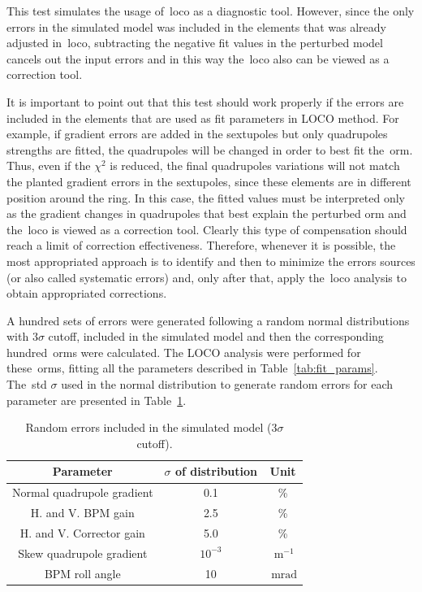 This test simulates the usage of~\gls{loco} as a diagnostic tool. However, since the only errors in the simulated model was included in the elements that was already adjusted in~\gls{loco}, subtracting the negative fit values in the perturbed model cancels out the input errors and in this way the~\gls{loco} also can be viewed as a correction tool.

It is important to point out that this test should work properly if the errors are included in the elements that are used as fit parameters in LOCO method. For example, if gradient errors are added in the sextupoles but only quadrupoles strengths are fitted, the quadrupoles will be changed in order to best fit the~\gls{orm}. Thus, even if the $\chi^2$ is reduced, the final quadrupoles variations will not match the planted gradient errors in the sextupoles, since these elements are in different position around the ring. In this case, the fitted values must be interpreted only as the gradient changes in quadrupoles that best explain the perturbed \gls{orm} and the~\gls{loco} is viewed as a correction tool. Clearly this type of compensation should reach a limit of correction effectiveness. Therefore, whenever it is possible, the most appropriated approach is to identify and then to minimize the errors sources (or also called systematic errors) and, only after that, apply the~\gls{loco} analysis to obtain appropriated corrections.

A hundred sets of errors were generated following a random normal distributions with $3\sigma$ cutoff, included in the simulated model and then the corresponding hundred~\gls{orm}s were calculated. The LOCO analysis were performed for these~\gls{orm}s, fitting all the parameters described in Table~\ref{tab:fit_params}. The~\gls{std} $\sigma$ used in the normal distribution to generate random errors for each parameter are presented in Table~\ref{tab:errors}.
\begin{table}
    \centering
    \caption{Random errors included in the simulated model ($3\sigma$ cutoff).}
    \label{tab:errors}
    \begin{tabular}{ccc}
        \toprule\toprule
        Parameter & $\sigma$ of distribution & Unit\\ 
        \hline
        Normal quadrupole gradient & 0.1 &\% \\
        H. and V. BPM gain &  2.5 & \% \\
        H. and V. Corrector gain & 5.0 &\% \\
        Skew quadrupole gradient & $10^{-3}$ &$\SI{}{\meter^{-1}}$ \\
        BPM roll angle & 10 & $\SI{}{\milli\radian}$ \\ 
        \bottomrule\bottomrule
    \end{tabular}
\end{table}

